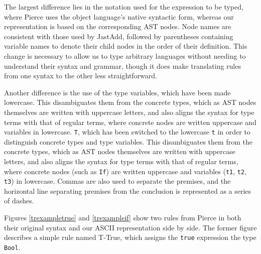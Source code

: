 \documentclass[nofilelist]{cslthse-msc}
\newcommand{\CR}[1]{\textcolor{green!60!black}{[\textbf{CR}:#1]}}
\begin{document}
The largest difference lies in the notation used for the expression to be typed, where Pierce uses the object language's native syntactic form, whereas our representation is based on the corresponding AST nodes.
Node names are consistent with those used by JastAdd, followed by parentheses containing variable names to denote their child nodes in the order of their definition.
This change is necessary to allow us to type arbitrary languages without needing to understand their syntax and grammar, though it does make translating rules from one syntax to the other less straightforward.

Another difference is the use of the type variables, which have been made lowercase.
This disambiguates them from the concrete types, which as AST nodes themselves are written with uppercase letters, and also aligns the syntax for type terms with that of regular terms, where concrete nodes are written uppercase and variables in lowercase.
\lstinline{T}, which has been switched to the lowercase \lstinline{t} in order to distinguish concrete types and type variables.
This disambiguates them from the concrete types, which as AST nodes themselves are written with uppercase letters, and also aligns the syntax for type terms with that of regular terms, where concrete nodes (such as \lstinline{If}) are written uppercase and variables (\lstinline{t1}, \lstinline{t2}, \lstinline{t3}) in lowercase.
Commas are also used to separate the premises, and the horizontal line separating premises from the conclusion is represented as a series of dashes.



Figures \ref{trexampletrue} and \ref{trexampleif} show two rules from Pierce in both their original syntax and our ASCII representation side by side.
The former figure describes a simple rule named T-True, which assigns the \lstinline{true} expression the type \lstinline{Bool}.
\end{document}
